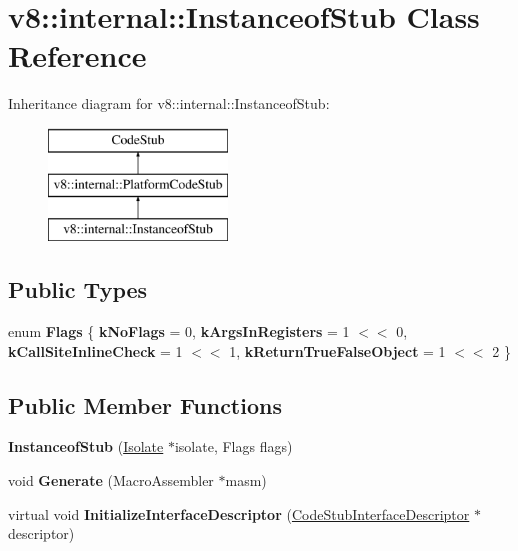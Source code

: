 \hypertarget{classv8_1_1internal_1_1_instanceof_stub}{}\section{v8\+:\+:internal\+:\+:Instanceof\+Stub Class Reference}
\label{classv8_1_1internal_1_1_instanceof_stub}
Inheritance diagram for v8\+:\+:internal\+:\+:Instanceof\+Stub\+:\begin{figure}[H]
\begin{center}
\leavevmode
\includegraphics[height=3.000000cm]{classv8_1_1internal_1_1_instanceof_stub}
\end{center}
\end{figure}
\subsection*{Public Types}
\begin{DoxyCompactItemize}
\item 
\hypertarget{classv8_1_1internal_1_1_instanceof_stub_a81de4f188b6873e3ebba10158de75c90}{}enum {\bfseries Flags} \{ {\bfseries k\+No\+Flags} = 0, 
{\bfseries k\+Args\+In\+Registers} = 1 $<$$<$ 0, 
{\bfseries k\+Call\+Site\+Inline\+Check} = 1 $<$$<$ 1, 
{\bfseries k\+Return\+True\+False\+Object} = 1 $<$$<$ 2
 \}\label{classv8_1_1internal_1_1_instanceof_stub_a81de4f188b6873e3ebba10158de75c90}

\end{DoxyCompactItemize}
\subsection*{Public Member Functions}
\begin{DoxyCompactItemize}
\item 
\hypertarget{classv8_1_1internal_1_1_instanceof_stub_a2a43db952a7fd3d0fbcafa2135090d5b}{}{\bfseries Instanceof\+Stub} (\hyperlink{classv8_1_1internal_1_1_isolate}{Isolate} $\ast$isolate, Flags flags)\label{classv8_1_1internal_1_1_instanceof_stub_a2a43db952a7fd3d0fbcafa2135090d5b}

\item 
\hypertarget{classv8_1_1internal_1_1_instanceof_stub_aeb95c434d22afdf5ad8ce88fa63ad83d}{}void {\bfseries Generate} (Macro\+Assembler $\ast$masm)\label{classv8_1_1internal_1_1_instanceof_stub_aeb95c434d22afdf5ad8ce88fa63ad83d}

\item 
\hypertarget{classv8_1_1internal_1_1_instanceof_stub_aca7a9f869798fa246da08676f210c7f1}{}virtual void {\bfseries Initialize\+Interface\+Descriptor} (\hyperlink{classv8_1_1internal_1_1_code_stub_interface_descriptor}{Code\+Stub\+Interface\+Descriptor} $\ast$descriptor)\label{classv8_1_1internal_1_1_instanceof_stub_aca7a9f869798fa246da08676f210c7f1}

\end{DoxyCompactItemize}
